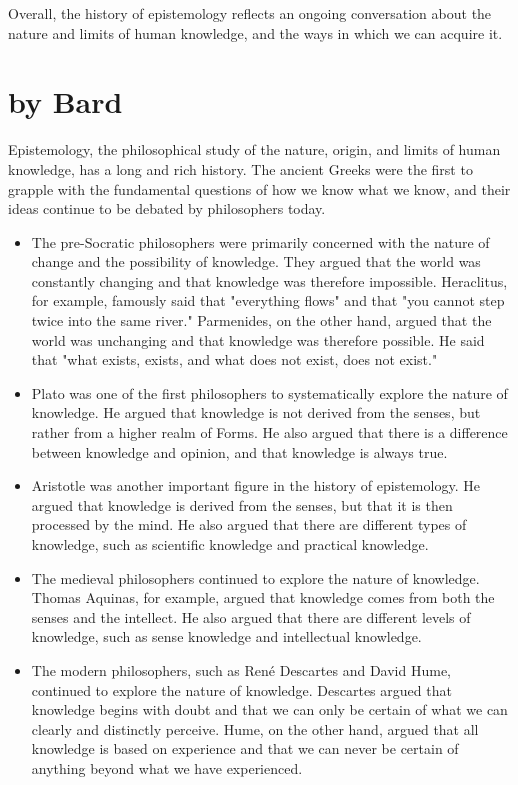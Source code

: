\documentclass[10pt,titlepage]{book}
\begin{document}
Overall, the history of epistemology reflects an ongoing conversation about the nature and limits of human knowledge, and the ways in which we can acquire it.

\section{by Bard}

Epistemology, the philosophical study of the nature, origin, and limits of human knowledge, has a long and rich history. The ancient Greeks were the first to grapple with the fundamental questions of how we know what we know, and their ideas continue to be debated by philosophers today.


\begin{itemize}

  \item The pre-Socratic philosophers were primarily concerned with the nature of change and the possibility of knowledge. They argued that the world was constantly changing and that knowledge was therefore impossible. Heraclitus, for example, famously said that "everything flows" and that "you cannot step twice into the same river." Parmenides, on the other hand, argued that the world was unchanging and that knowledge was therefore possible. He said that "what exists, exists, and what does not exist, does not exist."

\item Plato was one of the first philosophers to systematically explore the nature of knowledge. He argued that knowledge is not derived from the senses, but rather from a higher realm of Forms. He also argued that there is a difference between knowledge and opinion, and that knowledge is always true.

\item Aristotle was another important figure in the history of epistemology. He argued that knowledge is derived from the senses, but that it is then processed by the mind. He also argued that there are different types of knowledge, such as scientific knowledge and practical knowledge.

\item The medieval philosophers continued to explore the nature of knowledge. Thomas Aquinas, for example, argued that knowledge comes from both the senses and the intellect. He also argued that there are different levels of knowledge, such as sense knowledge and intellectual knowledge.

\item The modern philosophers, such as René Descartes and David Hume, continued to explore the nature of knowledge. Descartes argued that knowledge begins with doubt and that we can only be certain of what we can clearly and distinctly perceive. Hume, on the other hand, argued that all knowledge is based on experience and that we can never be certain of anything beyond what we have experienced.
\end{itemize}
\end{document}
